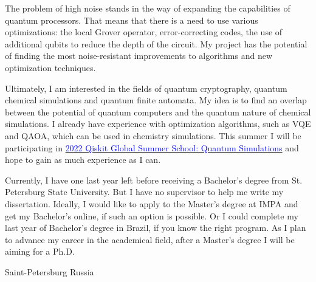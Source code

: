 \documentclass[11pt,a4paper,sans]{moderncv}        %
\begin{document}
	The problem of high noise stands in the way of expanding the capabilities of quantum processors. That means that there is a need to use various optimizations: the local Grover operator, error-correcting codes, the use of additional qubits to reduce the depth of the circuit. My project has the potential of finding the most noise-resistant improvements to algorithms and new optimization techniques.
	
	Ultimately, I am interested in the fields of quantum cryptography, quantum chemical simulations and quantum finite automata. My idea is to find an overlap between the potential of quantum computers and the quantum nature of chemical simulations. I already have experience with optimization algorithms, such as VQE and QAOA, which can be used in chemistry simulations. This summer I will be participating in \href{https://qiskit.org/events/summer-school/}{\textcolor{blue}{2022 Qiskit Global Summer School: Quantum Simulations}} and hope to gain as much experience as I can.
	
	Currently, I have one last year left before receiving a Bachelor's degree from St. Petersburg State University. But I have no supervisor to help me write my dissertation. Ideally, I would like to apply to the Master's degree at IMPA and get my Bachelor's online, if such an option is possible. Or I could complete my last year of Bachelor's degree in Brazil, if you know the right program. As I plan to advance my career in the academical field, after a Master's degree I will be aiming for a Ph.D.
	
	\title{}
	\address{Novoizmailovsky prospect, 16k8}{Saint-Petersburg}{ Russia }
	\makeletterclosing
	\name{}{}
\end{document}
